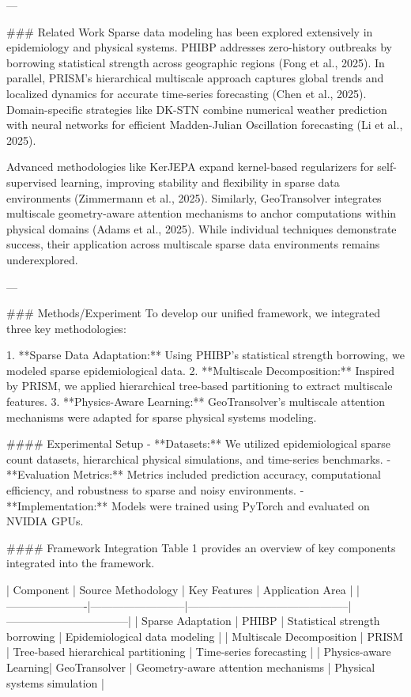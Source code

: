 ---

### Related Work  
Sparse data modeling has been explored extensively in epidemiology and physical systems. PHIBP addresses zero-history outbreaks by borrowing statistical strength across geographic regions (Fong et al., 2025). In parallel, PRISM's hierarchical multiscale approach captures global trends and localized dynamics for accurate time-series forecasting (Chen et al., 2025). Domain-specific strategies like DK-STN combine numerical weather prediction with neural networks for efficient Madden-Julian Oscillation forecasting (Li et al., 2025).

Advanced methodologies like KerJEPA expand kernel-based regularizers for self-supervised learning, improving stability and flexibility in sparse data environments (Zimmermann et al., 2025). Similarly, GeoTransolver integrates multiscale geometry-aware attention mechanisms to anchor computations within physical domains (Adams et al., 2025). While individual techniques demonstrate success, their application across multiscale sparse data environments remains underexplored.

---

### Methods/Experiment  
To develop our unified framework, we integrated three key methodologies:  

1. **Sparse Data Adaptation:** Using PHIBP's statistical strength borrowing, we modeled sparse epidemiological data.  
2. **Multiscale Decomposition:** Inspired by PRISM, we applied hierarchical tree-based partitioning to extract multiscale features.  
3. **Physics-Aware Learning:** GeoTransolver's multiscale attention mechanisms were adapted for sparse physical systems modeling.

#### Experimental Setup  
- **Datasets:** We utilized epidemiological sparse count datasets, hierarchical physical simulations, and time-series benchmarks.  
- **Evaluation Metrics:** Metrics included prediction accuracy, computational efficiency, and robustness to sparse and noisy environments.  
- **Implementation:** Models were trained using PyTorch and evaluated on NVIDIA GPUs.  

#### Framework Integration  
Table 1 provides an overview of key components integrated into the framework.

| Component            | Source Methodology       | Key Features                               | Application Area                |
|----------------------|--------------------------|--------------------------------------------|---------------------------------|
| Sparse Adaptation    | PHIBP                   | Statistical strength borrowing             | Epidemiological data modeling   |
| Multiscale Decomposition | PRISM                 | Tree-based hierarchical partitioning       | Time-series forecasting         |
| Physics-aware Learning| GeoTransolver           | Geometry-aware attention mechanisms        | Physical systems simulation     |


